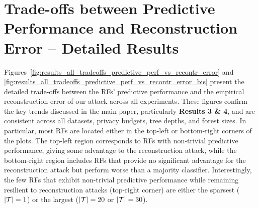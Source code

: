 \section{Trade-offs between Predictive Performance and Reconstruction Error -- Detailed Results}\label{appendix:complete_results_tradeoffs_perf_reconstr_error}

Figures~\ref{fig:results_all_tradeoffs_predictive_perf_vs_recontr_error} and \ref{fig:results_all_tradeoffs_predictive_perf_vs_recontr_error_bis} present the detailed trade-offs between the RFs' predictive performance and the empirical reconstruction error of our attack across all experiments. These figures confirm the key trends discussed in the main paper, particularly \textbf{Results 3 \& 4}, and are consistent across all datasets, privacy budgets, tree depths, and forest sizes. In particular, most RFs are located either in the top-left or bottom-right corners of the plots. The top-left region corresponds to RFs with non-trivial predictive performance, giving some advantage to the reconstruction attack, while the bottom-right region includes RFs that provide no significant advantage for the reconstruction attack but perform worse than a majority classifier. Interestingly, the few RFs that exhibit non-trivial predictive performance while remaining resilient to reconstruction attacks (top-right corner) are either the sparsest ($\lvert \mathcal{T} \rvert = 1$) or the largest ($\lvert \mathcal{T} \rvert = 20$ or $\lvert \mathcal{T} \rvert = 30$). 

